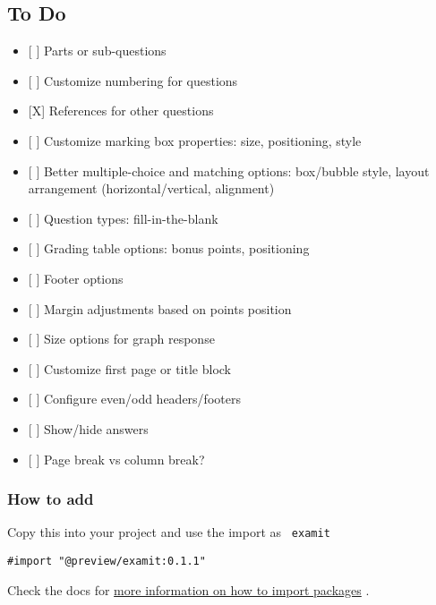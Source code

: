 
\subsection{To Do}\label{to-do}

\begin{itemize}
\tightlist
\item
  {[} {]} Parts or sub-questions
\item
  {[} {]} Customize numbering for questions
\item
  {[}X{]} References for other questions
\item
  {[} {]} Customize marking box properties: size, positioning, style
\item
  {[} {]} Better multiple-choice and matching options: box/bubble style,
  layout arrangement (horizontal/vertical, alignment)
\item
  {[} {]} Question types: fill-in-the-blank
\item
  {[} {]} Grading table options: bonus points, positioning
\item
  {[} {]} Footer options
\item
  {[} {]} Margin adjustments based on points position
\item
  {[} {]} Size options for graph response
\item
  {[} {]} Customize first page or title block
\item
  {[} {]} Configure even/odd headers/footers
\item
  {[} {]} Show/hide answers
\item
  {[} {]} Page break vs column break?
\end{itemize}

\subsubsection{How to add}\label{how-to-add}

Copy this into your project and use the import as \texttt{\ examit\ }

\begin{verbatim}
#import "@preview/examit:0.1.1"
\end{verbatim}



Check the docs for
\href{https://typst.app/docs/reference/scripting/\#packages}{more
information on how to import packages} .

